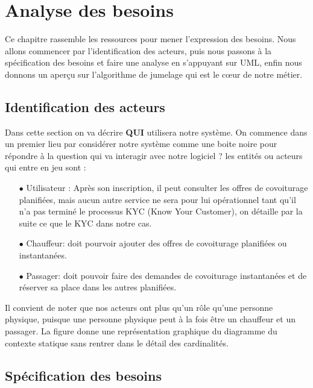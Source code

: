 \chapter{Analyse des besoins}
Ce chapitre rassemble les ressources pour mener l'expression des besoins. Nous allons commencer par l'identification des acteurs, puis nous passons à la spécification des besoins et faire une analyse en s'appuyant sur UML, enfin nous donnons un aperçu sur l'algorithme de jumelage qui est le cœur de notre métier.
\section{Identification des acteurs}
Dans cette section on va décrire \textbf{QUI} utilisera notre système. On commence dans un premier lieu par considérer notre système comme une boite noire pour répondre à la question qui va interagir avec notre logiciel ?\newline
les entités ou acteurs qui entre en jeu sont :
\begin{itemize}
	\item[$\bullet$] Utilisateur : Après son inscription, il peut consulter les offres de covoiturage planifiées, mais aucun autre service ne sera pour lui opérationnel tant qu'il n'a pas terminé le processus KYC (Know Your Customer), on détaille par la suite ce que le KYC dans notre cas.
	\item[$\bullet$] Chauffeur: doit pourvoir ajouter des offres de covoiturage planifiées ou instantanées.
	\item[$\bullet$] Passager: doit pouvoir faire des demandes de covoiturage instantanées et de réserver sa place dans les autres planifiées.
\end{itemize}
Il convient de noter que nos acteurs ont plus qu'un rôle qu'une personne physique, puisque une personne physique peut à la fois être un chauffeur et un passager.\newline
La figure  donne une représentation graphique du diagramme du contexte statique sans rentrer dans le détail des cardinalités.

\section{Spécification des besoins}
